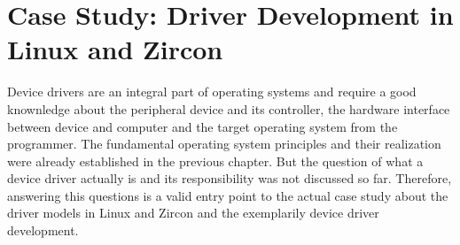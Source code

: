 
\chapter{Case Study: Driver Development in Linux and Zircon}\label{ch:case-study}
Device drivers are an integral part of operating systems and require a good knownledge about the peripheral device and its controller, the hardware interface between device and computer and the target operating system from the programmer.
The fundamental operating system principles and their realization were already established in the previous chapter.
But the question of what a device driver actually is and its responsibility was not discussed so far.
Therefore, answering this questions is a valid entry point to the actual case study about the driver models in Linux and Zircon and the exemplarily device driver development.

